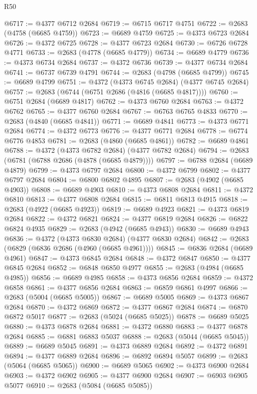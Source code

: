 \begin{lexlean}{R50}
\begin{coremodule}
@6717 := @4377 @6712 @2684
@6719 := @6715 @6717 @4751
@6722 := @2683 (@4758 (@6685 @4759))
@6723 := @6689 @4759
@6725 := @4373 @6723 @2684
@6726 := @4372 @6725
@6728 := @4377 @6723 @2684
@6730 := @6726 @6728 @4771
@6733 := @2683 (@4778 (@6685 @4779))
@6734 := @6689 @4779
@6736 := @4373 @6734 @2684
@6737 := @4372 @6736
@6739 := @4377 @6734 @2684
@6741 := @6737 @6739 @4791
@6744 := @2683 (@4798 (@6685 @4799))
@6745 := @6689 @4799
@6751 := @4372 (@4373 @6745 @2684) (@4377 @6745 @2684)
@6757 := @2683 (@6744 (@6751 @2686 (@4816 (@6685 @4817))))
@6760 := @6751 @2684 (@6689 @4817)
@6762 := @4373 @6760 @2684
@6763 := @4372 @6762
@6765 := @4377 @6760 @2684
@6767 := @6763 @6765 @4833
@6770 := @2683 (@4840 (@6685 @4841))
@6771 := @6689 @4841
@6773 := @4373 @6771 @2684
@6774 := @4372 @6773
@6776 := @4377 @6771 @2684
@6778 := @6774 @6776 @4853
@6781 := @2683 (@4860 (@6685 @4861))
@6782 := @6689 @4861
@6788 := @4372 (@4373 @6782 @2684) (@4377 @6782 @2684)
@6794 := @2683 (@6781 (@6788 @2686 (@4878 (@6685 @4879))))
@6797 := @6788 @2684 (@6689 @4879)
@6799 := @4373 @6797 @2684
@6800 := @4372 @6799
@6802 := @4377 @6797 @2684
@6804 := @6800 @6802 @4895
@6807 := @2683 (@4902 (@6685 @4903))
@6808 := @6689 @4903
@6810 := @4373 @6808 @2684
@6811 := @4372 @6810
@6813 := @4377 @6808 @2684
@6815 := @6811 @6813 @4915
@6818 := @2683 (@4922 (@6685 @4923))
@6819 := @6689 @4923
@6821 := @4373 @6819 @2684
@6822 := @4372 @6821
@6824 := @4377 @6819 @2684
@6826 := @6822 @6824 @4935
@6829 := @2683 (@4942 (@6685 @4943))
@6830 := @6689 @4943
@6836 := @4372 (@4373 @6830 @2684) (@4377 @6830 @2684)
@6842 := @2683 (@6829 (@6836 @2686 (@4960 (@6685 @4961))))
@6845 := @6836 @2684 (@6689 @4961)
@6847 := @4373 @6845 @2684
@6848 := @4372 @6847
@6850 := @4377 @6845 @2684
@6852 := @6848 @6850 @4977
@6855 := @2683 (@4984 (@6685 @4985))
@6856 := @6689 @4985
@6858 := @4373 @6856 @2684
@6859 := @4372 @6858
@6861 := @4377 @6856 @2684
@6863 := @6859 @6861 @4997
@6866 := @2683 (@5004 (@6685 @5005))
@6867 := @6689 @5005
@6869 := @4373 @6867 @2684
@6870 := @4372 @6869
@6872 := @4377 @6867 @2684
@6874 := @6870 @6872 @5017
@6877 := @2683 (@5024 (@6685 @5025))
@6878 := @6689 @5025
@6880 := @4373 @6878 @2684
@6881 := @4372 @6880
@6883 := @4377 @6878 @2684
@6885 := @6881 @6883 @5037
@6888 := @2683 (@5044 (@6685 @5045))
@6889 := @6689 @5045
@6891 := @4373 @6889 @2684
@6892 := @4372 @6891
@6894 := @4377 @6889 @2684
@6896 := @6892 @6894 @5057
@6899 := @2683 (@5064 (@6685 @5065))
@6900 := @6689 @5065
@6902 := @4373 @6900 @2684
@6903 := @4372 @6902
@6905 := @4377 @6900 @2684
@6907 := @6903 @6905 @5077
@6910 := @2683 (@5084 (@6685 @5085))

\end{coremodule}
\end{lexlean}
